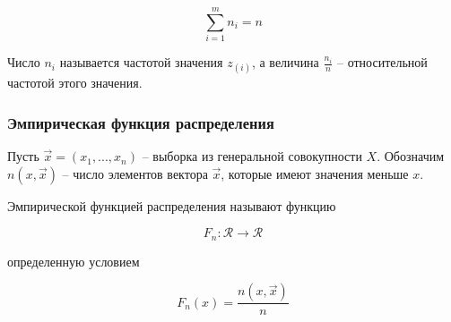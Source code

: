 \begin{note}
    \begin{equation*}
        \sum_{i=1}^m n_i = n
    \end{equation*}
\end{note}

\begin{defenition}
    Число $n_i$ называется частотой значения $z_{(i)}$, а
    величина $\frac{n_i}{n}$ -- относительной частотой этого
    значения.
\end{defenition}

\subsubsection{Эмпирическая функция распределения}

Пусть $\vec x = (x_1, ..., x_n)$ -- выборка из генеральной
совокупности $X$. Обозначим $n(x, \vec x)$ -- число элементов вектора
$\vec x$, которые имеют значения меньше $x$.

\begin{defenition}
    Эмпирической функцией распределения называют функцию

    \begin{equation*}
        F_n : \mathcal R \to \mathcal R
    \end{equation*}

    определенную условием

    \begin{equation*}
        F_n(x) = \frac{n(x, \vec x)}{n}
    \end{equation*}
\end{defenition}

